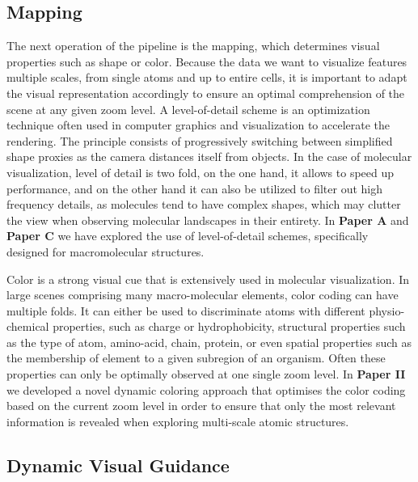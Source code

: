 \subsection{Mapping}

The next operation of the pipeline is the mapping, which determines visual properties such as shape or color.
Because the data we want to visualize features multiple scales, from single atoms and up to entire cells, it is important to adapt the visual representation accordingly to ensure an optimal comprehension of the scene at any given zoom level.
A level-of-detail scheme is an optimization technique often used in computer graphics and visualization to accelerate the rendering.
The principle consists of progressively switching between simplified shape proxies as the camera distances itself from objects.
In the case of molecular visualization, level of detail is two fold, on the one hand, it allows to speed up performance, and on the other hand it can also be utilized to filter out high frequency details, as molecules tend to have complex shapes, which may clutter the view when observing molecular landscapes in their entirety.
In \textbf{Paper A} and \textbf{Paper C} we have explored the use of level-of-detail schemes, specifically designed for macromolecular structures. 

Color is a strong visual cue that is extensively used in molecular visualization.
In large scenes comprising many macro-molecular elements, color coding can have multiple folds.
It can either be used to discriminate atoms with different physio-chemical properties, such as charge or hydrophobicity, structural properties such as the type of atom, amino-acid, chain, protein, or even spatial properties such as the membership of element to a given subregion of an organism.
Often these properties can only be optimally observed at one single zoom level.
In \textbf{Paper II} we developed a novel dynamic coloring approach that optimises the color coding based on the current zoom level in order to ensure that only the most relevant information is revealed when exploring multi-scale atomic structures.

\subsection{Dynamic Visual Guidance}

